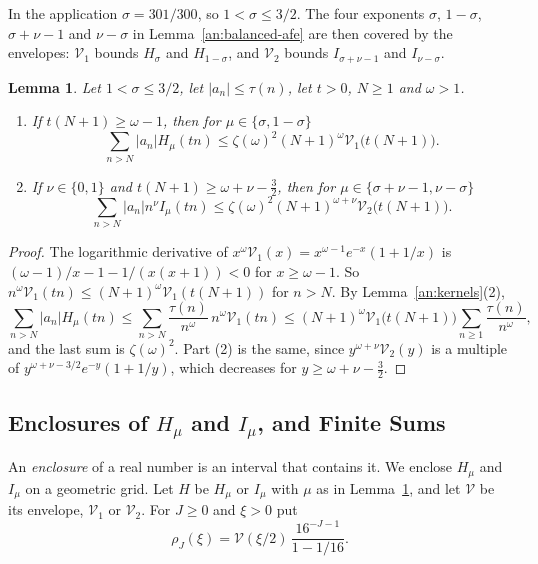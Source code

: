 \documentclass[11pt]{amsart}
\numberwithin{equation}{section}
\newtheorem{lemma}[equation]{Lemma}
\theoremstyle{definition}
\theoremstyle{remark}
\begin{document}
In the application $\sigma=301/300$, so $1<\sigma\le3/2$. The four exponents $\sigma$,
$1-\sigma$, $\sigma+\nu-1$ and $\nu-\sigma$ in Lemma~\ref{an:balanced-afe}
are then covered by the envelopes: $\mathcal V_1$ bounds $H_\sigma$ and
$H_{1-\sigma}$, and $\mathcal V_2$ bounds $I_{\sigma+\nu-1}$ and
$I_{\nu-\sigma}$.

\begin{lemma}\label{an:tails}
Let $1<\sigma\le3/2$, let $|a_n|\le\tau(n)$, let $t>0$, $N\ge1$ and
$\omega>1$.
\begin{enumerate}
\item If $t(N+1)\ge\omega-1$, then for $\mu\in\{\sigma,1-\sigma\}$
\[
 \sum_{n>N}|a_n|H_\mu(tn)\le\zeta(\omega)^2(N+1)^\omega
 \mathcal V_1\bigl(t(N+1)\bigr).
\]
\item If $\nu\in\{0,1\}$ and $t(N+1)\ge\omega+\nu-\frac32$, then for
 $\mu\in\{\sigma+\nu-1,\nu-\sigma\}$
\[
 \sum_{n>N}|a_n|n^\nu I_\mu(tn)\le\zeta(\omega)^2(N+1)^{\omega+\nu}
 \mathcal V_2\bigl(t(N+1)\bigr).
\]
\end{enumerate}
\end{lemma}

\begin{proof}
The logarithmic derivative of
$x^\omega\mathcal V_1(x)=x^{\omega-1}e^{-x}(1+1/x)$ is
$(\omega-1)/x-1-1/(x(x+1))<0$ for $x\ge\omega-1$. So
$n^\omega\mathcal V_1(tn)\le(N+1)^\omega\mathcal V_1(t(N+1))$ for $n>N$. By
Lemma~\ref{an:kernels}(2),
\[
 \sum_{n>N}|a_n|H_\mu(tn)\le\sum_{n>N}\frac{\tau(n)}{n^\omega}\,
 n^\omega\mathcal V_1(tn)\le(N+1)^\omega\mathcal V_1\bigl(t(N+1)\bigr)
 \sum_{n\ge1}\frac{\tau(n)}{n^\omega},
\]
and the last sum is $\zeta(\omega)^2$. Part (2) is the same, since
$y^{\omega+\nu}\mathcal V_2(y)$ is a multiple of
$y^{\omega+\nu-3/2}e^{-y}(1+1/y)$, which decreases for
$y\ge\omega+\nu-\frac32$.
\end{proof}

\subsection{\texorpdfstring{Enclosures of $H_\mu$ and $I_\mu$, and Finite Sums}{Enclosures of H and I, and Finite Sums}}
\label{an:kernel-enclosures}
An \emph{enclosure} of a real number is an interval that contains it. We
enclose $H_\mu$ and $I_\mu$ on a geometric grid. Let $H$ be $H_\mu$ or $I_\mu$
with $\mu$ as in Lemma~\ref{an:tails}, and let $\mathcal V$ be its envelope,
$\mathcal V_1$ or $\mathcal V_2$. For $J\ge0$ and $\xi>0$ put
\[
 \rho_J(\xi)=\mathcal V(\xi/2)\,\frac{16^{-J-1}}{1-1/16}.
\]
\end{document}
